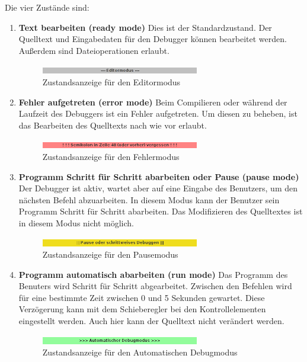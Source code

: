 Die vier Zustände sind:
\begin{enumerate}
\item \textbf{Text bearbeiten (ready mode)}
Dies ist der Standardzustand. Der Quelltext und Eingabedaten für den Debugger können bearbeitet werden. Außerdem sind Dateioperationen erlaubt.
\begin{figure}[h!tp]
\centering
\includegraphics[width=0.65\textwidth]{./media/images/gui/debugger/mode-idle.png}
\caption{Zustandsanzeige für den Editormodus}
\label{fig:deb-zust-1}
\end{figure}
\item \textbf{Fehler aufgetreten (error mode)}
Beim Compilieren oder während der Laufzeit des Debuggers ist ein Fehler aufgetreten. Um diesen zu beheben, ist das Bearbeiten des Quelltexts nach wie vor erlaubt.
\begin{figure}[h!tp]
\centering
\includegraphics[width=0.65\textwidth]{./media/images/gui/debugger/mode-error.png}
\caption{Zustandsanzeige für den Fehlermodus}
\label{fig:deb-zust-2}
\end{figure}
\item \textbf{Programm Schritt für Schritt abarbeiten oder Pause (pause mode)}
Der Debugger ist aktiv, wartet aber auf eine Eingabe des Benutzers, um den nächsten Befehl abzuarbeiten. In diesem Modus kann der Benutzer sein Programm Schritt für Schritt abarbeiten. Das Modifizieren des Quelltextes ist in diesem Modus nicht möglich.
\begin{figure}[h!tp]
\centering
\includegraphics[width=0.65\textwidth]{./media/images/gui/debugger/mode-step.png}
\caption{Zustandsanzeige für den Pausemodus}
\label{fig:deb-zust-3}
\end{figure}
\item \textbf{Programm automatisch abarbeiten (run mode)}
Das Programm des Benuters wird Schritt für Schritt abgearbeitet. Zwischen den Befehlen wird für eine bestimmte Zeit zwischen 0 und 5 Sekunden gewartet. Diese Verzögerung kann mit dem Schieberegler bei den Kontrollelementen eingestellt werden. Auch hier kann der Quelltext nicht verändert werden.
\begin{figure}[h!tp]
\centering
\includegraphics[width=0.65\textwidth]{./media/images/gui/debugger/mode-run.png}
\caption{Zustandsanzeige für den Automatischen Debugmodus}
\label{fig:deb-zust-4}
\end{figure}
\end{enumerate}

